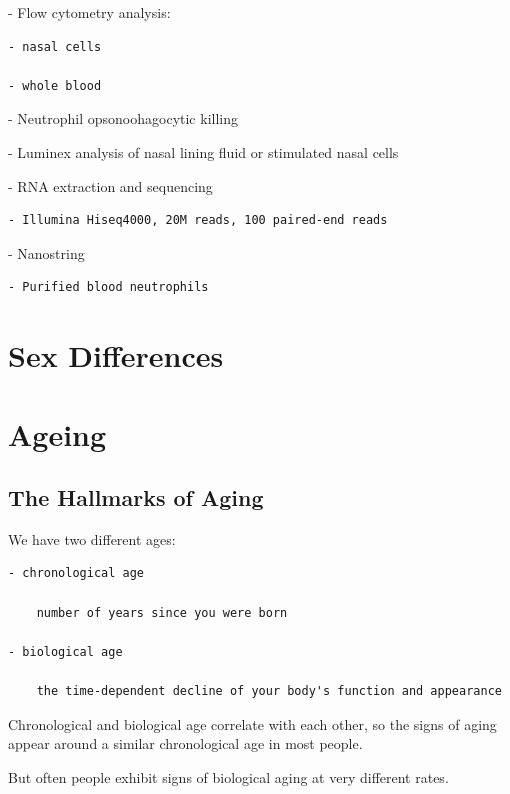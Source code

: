 \documentclass[
]{book}
\begin{document}
- Flow cytometry analysis:

\begin{verbatim}
- nasal cells

- whole blood
\end{verbatim}

- Neutrophil opsonoohagocytic killing

- Luminex analysis of nasal lining fluid or stimulated nasal cells

- RNA extraction and sequencing

\begin{verbatim}
- Illumina Hiseq4000, 20M reads, 100 paired-end reads
\end{verbatim}

- Nanostring

\begin{verbatim}
- Purified blood neutrophils
\end{verbatim}

\hypertarget{sex-differences-1}{%
\chapter{Sex Differences}\label{sex-differences-1}}

\hypertarget{ageing-1}{%
\chapter{Ageing}\label{ageing-1}}

\hypertarget{the-hallmarks-of-aging}{%
\section{The Hallmarks of Aging}\label{the-hallmarks-of-aging}}

We have two different ages:

\begin{verbatim}
- chronological age

    number of years since you were born

- biological age

    the time-dependent decline of your body's function and appearance
\end{verbatim}

Chronological and biological age correlate with each other, so the signs of aging appear around a similar chronological age in most people.

But often people exhibit signs of biological aging at very different rates.
\end{document}

